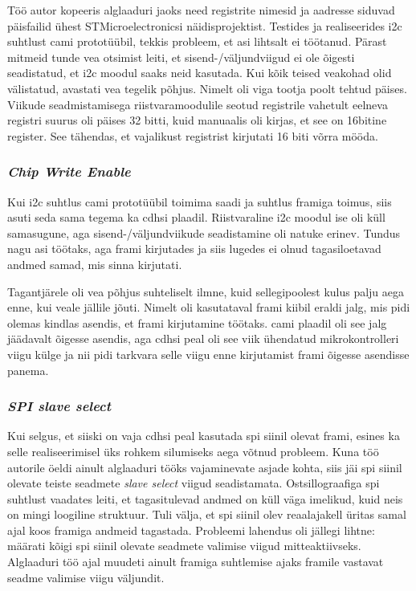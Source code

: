 \documentclass[12pt,a4paper]{article}
\begin{document}
Töö autor kopeeris alglaaduri jaoks need registrite nimesid ja aadresse siduvad
päisfailid ühest STMicroelectronicsi näidisprojektist. Testides ja
realiseerides \gls{i2c} suhtlust \gls{cam}i prototüübil, tekkis probleem, et
asi lihtsalt ei töötanud. Pärast mitmeid tunde vea otsimist leiti, et
sisend-/väljundviigud ei ole õigesti seadistatud, et \gls{i2c} moodul saaks neid
kasutada. Kui kõik teised veakohad olid välistatud, avastati vea tegelik põhjus.
Nimelt oli viga tootja poolt tehtud päises. Viikude seadmistamisega
riistvaramoodulile seotud registrile vahetult eelneva registri suurus oli päises
32 bitti, kuid manuaalis oli kirjas, et see on 16bitine register. See tähendas,
et vajalikust registrist kirjutati 16 biti võrra mööda.
\subsubsection{\textit{Chip Write Enable}}
Kui \gls{i2c} suhtlus \gls{cam}i prototüübil toimima saadi ja suhtlus
\gls{fram}iga toimus, siis asuti seda sama tegema ka \gls{cdhs}i plaadil.
Riistvaraline \gls{i2c} moodul ise oli küll samasugune, aga
sisend-/väljundviikude seadistamine oli natuke erinev. Tundus nagu asi töötaks,
aga \gls{fram}i kirjutades ja siis lugedes ei olnud tagasiloetavad andmed samad,
mis sinna kirjutati.

Tagantjärele oli vea põhjus suhteliselt ilmne, kuid sellegipoolest kulus palju
aega enne, kui veale jällile jõuti. Nimelt oli kasutataval \gls{fram}i kiibil
eraldi jalg, mis pidi olemas kindlas asendis, et \gls{fram}i kirjutamine
töötaks. \gls{cam}i plaadil oli see jalg jäädavalt õigesse asendis, aga
\gls{cdhs}i peal oli see viik ühendatud mikrokontrolleri viigu külge ja nii pidi
tarkvara selle viigu enne kirjutamist \gls{fram}i õigesse asendisse panema.

\subsubsection{\textit{SPI slave select}}
Kui selgus, et siiski on vaja \gls{cdhs}i peal kasutada \gls{spi} siinil olevat
\gls{fram}i, esines ka selle realiseerimisel üks rohkem silumiseks aega võtnud
probleem.  Kuna töö autorile öeldi ainult alglaaduri tööks vajaminevate asjade
kohta, siis jäi \gls{spi} siinil olevate teiste seadmete \textit{slave select}
viigud seadistamata. Ostsillograafiga \gls{spi} suhtlust vaadates leiti, et
tagasitulevad andmed on küll väga imelikud, kuid neis on mingi loogiline
struktuur. Tuli välja, et \gls{spi} siinil olev reaalajakell üritas samal ajal
koos \gls{fram}iga andmeid tagastada. Probleemi lahendus oli jällegi lihtne:
määrati kõigi \gls{spi} siinil olevate seadmete valimise viigud mitteaktiivseks.
Alglaaduri töö ajal muudeti ainult \gls{fram}iga suhtlemise ajaks
\gls{fram}ile vastavat seadme valimise viigu väljundit.
\end{document}
